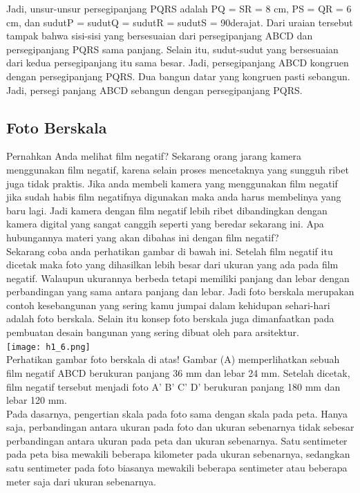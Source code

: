 \documentclass[11pt,fleqn]{book} %
\begin{document}
Jadi, unsur-unsur persegipanjang PQRS adalah PQ = SR = 8 cm, PS = QR = 6 cm, dan sudutP = sudutQ = sudutR = sudutS = 90derajat.  Dari uraian tersebut tampak bahwa sisi-sisi yang bersesuaian dari persegipanjang ABCD dan persegipanjang PQRS sama panjang. Selain itu, sudut-sudut yang bersesuaian dari kedua persegipanjang itu sama besar. Jadi, persegipanjang ABCD kongruen dengan persegipanjang PQRS. Dua bangun datar yang kongruen pasti sebangun. Jadi, persegi panjang ABCD sebangun dengan persegipanjang PQRS.\\

\subsection{Foto Berskala}

Pernahkan Anda melihat film negatif? Sekarang orang jarang kamera menggunakan film negatif, karena selain proses mencetaknya yang sungguh ribet juga tidak praktis. Jika anda membeli kamera yang menggunakan film negatif jika sudah habis film negatifnya digunakan maka anda harus membelinya yang baru lagi. Jadi kamera dengan film negatif lebih ribet dibandingkan dengan kamera digital yang sangat canggih seperti yang beredar sekarang ini. Apa hubungannya materi yang akan dibahas ini dengan film negatif?\\

Sekarang coba anda perhatikan gambar di bawah ini. Setelah film negatif itu dicetak maka foto yang dihasilkan lebih besar dari ukuran yang ada pada film negatif. Walaupun ukurannya berbeda tetapi memiliki panjang dan lebar dengan perbandingan yang sama antara panjang dan lebar. Jadi foto berskala merupakan contoh kesebangunan yang sering kamu jumpai dalam kehidupan sehari-hari adalah foto berskala. Selain itu konsep foto berskala juga dimanfaatkan pada pembuatan desain bangunan yang sering dibuat oleh para arsitektur.\\

 \texttt{[image: h1\_6.png]}\\
Perhatikan gambar foto berskala di atas! Gambar (A) memperlihatkan sebuah film negatif ABCD berukuran panjang 36 mm dan lebar 24 mm. Setelah dicetak, film negatif tersebut menjadi foto A' B' C' D' berukuran panjang 180 mm dan lebar 120 mm.\\

Pada dasarnya, pengertian skala pada foto sama dengan skala pada peta. Hanya saja, perbandingan antara ukuran pada foto dan ukuran sebenarnya tidak sebesar perbandingan antara ukuran pada peta dan ukuran sebenarnya. Satu sentimeter pada peta bisa mewakili beberapa kilometer pada ukuran sebenarnya, sedangkan satu sentimeter pada foto biasanya mewakili beberapa sentimeter atau beberapa meter saja dari ukuran sebenarnya.\\
\end{document}
